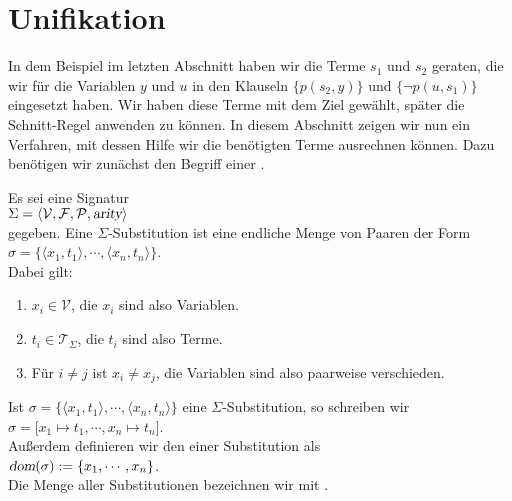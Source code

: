 \section{Unifikation}
In dem  Beispiel im letzten Abschnitt haben wir die Terme $s_1$ und $s_2$ geraten, die wir für die Variablen
$y$ und $u$ in den Klauseln $\big\{ p(s_2,y) \big\}$ und  $\big\{\neg p(u,s_1)\big\}$
eingesetzt haben.  Wir haben diese Terme mit dem Ziel gewählt, später die Schnitt-Regel
anwenden zu können.  In diesem Abschnitt zeigen wir nun ein Verfahren, mit dessen Hilfe
wir die benötigten Terme ausrechnen können.
Dazu benötigen wir zunächst den Begriff einer .
\begin{Definition}[Substitution]
    Es sei eine Signatur \\[0.2cm]
    \hspace*{1.3cm} $\Sigma = \langle \mathcal{V}, \mathcal{F}, \mathcal{P}, \textsl{arity} \rangle$ \\[0.2cm]
    gegeben.  Eine {\color{blue}$\Sigma$-Substitution} ist eine endliche Menge von Paaren der Form \\[0.2cm]
    \hspace*{1.3cm} $\sigma = \bigl\{ \langle x_1, t_1 \rangle, \cdots, \langle x_n, t_n \rangle \bigr\}$. \\[0.2cm]
    Dabei gilt:
    \begin{enumerate}
    \item $x_i \in \mathcal{V}$, die $x_i$ sind also Variablen.
    \item $t_i \in \mathcal{T}_\Sigma$, die $t_i$ sind also Terme.
    \item Für $i\not=j$ ist $x_i \not= x_j$, die Variablen sind also paarweise verschieden.
    \end{enumerate}
    
    Ist $\sigma = \bigl\{ \langle x_1, t_1 \rangle, \cdots, \langle x_n, t_n \rangle \bigr\}$ eine
    $\Sigma$-Substitution, so schreiben wir  \\[0.2cm]
    \hspace*{1.3cm} $\sigma = \bigl[ x_1 \mapsto t_1, \cdots, x_n \mapsto t_n \bigr]$.  \\[0.2cm]
    Außerdem definieren wir den  einer Substitution als \\[0.2cm]
    \hspace*{1.3cm} $\textsl{dom}(\sigma) := \{ x_1, \cdots, x_n\}$.
    \\[0.2cm]
    Die Menge aller Substitutionen bezeichnen wir mit .
    \eox
\end{Definition}

